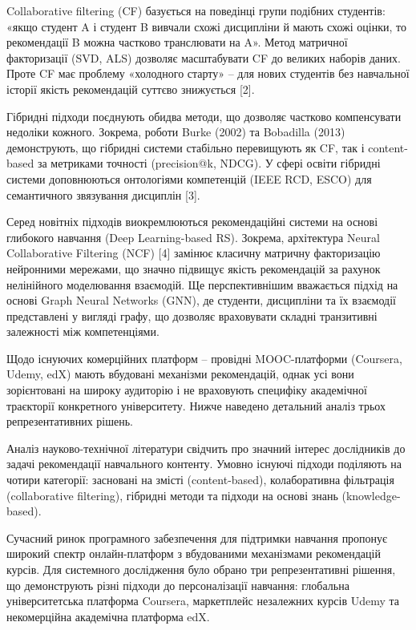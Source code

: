 \documentclass[
]{article}
\begin{document}
Collaborative filtering (CF) базується на поведінці групи подібних
студентів: «якщо студент A і студент B вивчали схожі дисципліни й мають
схожі оцінки, то рекомендації B можна частково транслювати на A». Метод
матричної факторизації (SVD, ALS) дозволяє масштабувати CF до великих
наборів даних. Проте CF має проблему «холодного старту» -- для нових
студентів без навчальної історії якість рекомендацій суттєво знижується
{[}2{]}.

Гібридні підходи поєднують обидва методи, що дозволяє частково
компенсувати недоліки кожного. Зокрема, роботи Burke (2002) та Bobadilla
(2013) демонструють, що гібридні системи стабільно перевищують як CF,
так і content-based за метриками точності (precision@k, NDCG). У сфері
освіти гібридні системи доповнюються онтологіями компетенцій (IEEE RCD,
ESCO) для семантичного зв\textquotesingle язування дисциплін {[}3{]}.

Серед новітніх підходів виокремлюються рекомендаційні системи на основі
глибокого навчання (Deep Learning-based RS). Зокрема, архітектура Neural
Collaborative Filtering (NCF) {[}4{]} замінює класичну матричну
факторизацію нейронними мережами, що значно підвищує якість рекомендацій
за рахунок нелінійного моделювання взаємодій. Ще перспективнішим
вважається підхід на основі Graph Neural Networks (GNN), де студенти,
дисципліни та їх взаємодії представлені у вигляді графу, що дозволяє
враховувати складні транзитивні залежності між компетенціями.

Щодо існуючих комерційних платформ -- провідні MOOC-платформи (Coursera,
Udemy, edX) мають вбудовані механізми рекомендацій, однак усі вони
зорієнтовані на широку аудиторію і не враховують специфіку академічної
траєкторії конкретного університету. Нижче наведено детальний аналіз
трьох репрезентативних рішень.

Аналіз науково-технічної літератури свідчить про значний інтерес
дослідників до задачі рекомендації навчального контенту. Умовно існуючі
підходи поділяють на чотири категорії: засновані на змісті
(content-based), колаборативна фільтрація (collaborative filtering),
гібридні методи та підходи на основі знань (knowledge-based).

Сучасний ринок програмного забезпечення для підтримки навчання пропонує
широкий спектр онлайн-платформ з вбудованими механізмами рекомендацій
курсів. Для системного дослідження було обрано три репрезентативні
рішення, що демонструють різні підходи до персоналізації навчання:
глобальна університетська платформа Coursera, маркетплейс незалежних
курсів Udemy та некомерційна академічна платформа edX.
\end{document}
